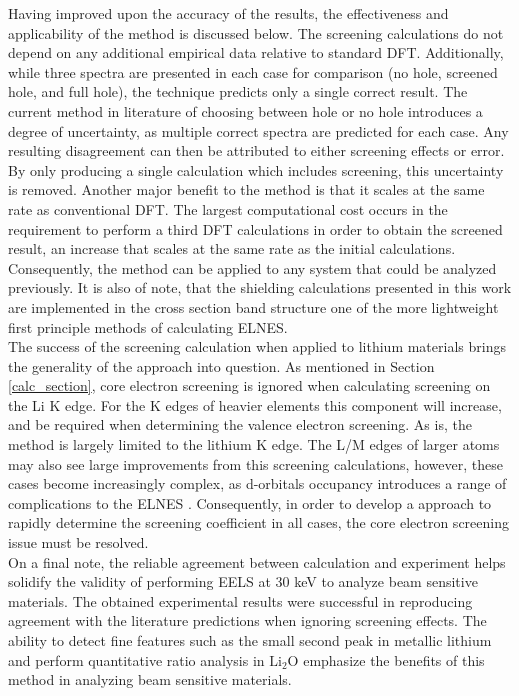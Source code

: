 Having improved upon the accuracy of the results, the effectiveness and applicability of the method is discussed below. The screening calculations do not depend on any additional empirical data relative to standard DFT.  Additionally, while three spectra are presented in each case for comparison (no hole, screened hole, and full hole), the technique predicts only a single correct result.  The current method in literature of choosing between hole or no hole introduces a degree of uncertainty, as multiple correct spectra are predicted for each case.   Any resulting disagreement can then be attributed to either screening effects or error. By only producing a single calculation which includes screening, this uncertainty is removed.  Another major benefit to the method is that it scales at the same rate as conventional DFT.  The largest computational cost occurs in the requirement to perform a third DFT calculations in order to obtain the screened result, an increase that scales at the same rate as the initial calculations.  Consequently, the method can be applied to any system that could be analyzed previously.  It is also of note, that the shielding calculations presented in this work are implemented in the cross section band structure one of the more lightweight first principle methods of calculating ELNES.\\

The success of the screening calculation when applied to lithium materials brings the generality of the approach into question.  As mentioned in Section \ref{calc_section}, core electron screening is ignored when calculating screening on the Li K edge.  For the K edges of heavier elements this component will increase, and be required when determining the valence electron screening.  As is, the method is largely limited to the lithium K edge.  The L/M edges of larger atoms may also see large improvements from this screening calculations, however, these cases become increasingly complex, as d-orbitals occupancy introduces a range of complications to the ELNES \cite{hubbard_electron_1963}. Consequently, in order to develop a approach to rapidly determine the screening coefficient in all cases, the core electron screening issue must be resolved.  \\


On a  final note, the reliable agreement between calculation and experiment helps solidify the validity of performing EELS at 30 keV to analyze beam sensitive materials.  The obtained experimental results were successful in reproducing agreement with the literature predictions when ignoring screening effects.  The ability to detect fine features such as the small second peak in metallic lithium and perform quantitative ratio analysis in $ \mathrm{Li_2O} $ emphasize the benefits of this method in analyzing beam sensitive materials.  \\








